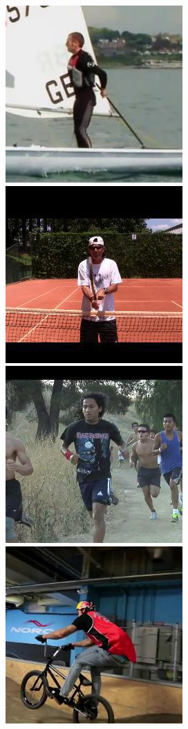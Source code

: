 \begin{figure}[t!]
    \hfill
    \includegraphics[height=\flowhh]{Figures/pose/qualitative/view/view_img_02}
    \hfill
    \includegraphics[height=\flowhh]{Figures/pose/qualitative/view/view_img_04}
    \hfill
    \includegraphics[height=\flowhh]{Figures/pose/qualitative/view/view_img_06}
    \hfill
    \includegraphics[height=\flowhh]{Figures/pose/qualitative/view/view_img_113}

\end{figure}
